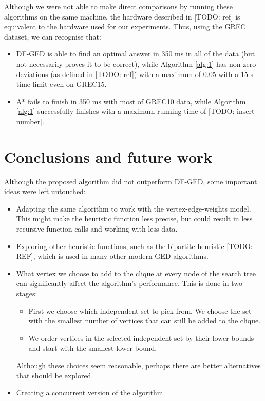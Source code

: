 \documentclass{article}
\theoremstyle{definition}
\begin{document}
Although we were not able to make direct comparisons by running these algorithms on the same machine, the hardware described in [TODO: ref] is equivalent to the hardware used for our experiments. Thus, using the GREC dataset, we can recognise that:
\begin{itemize}
\item DF-GED is able to find an optimal answer in 350 ms in all of the data (but not necessarily proves it to be correct), while Algorithm \ref{alg:1} has non-zero deviations (as defined in [TODO: ref]) with a maximum of 0.05 with a 15 s time limit even on GREC15.
\item A* fails to finish in 350 ms with most of GREC10 data, while Algorithm \ref{alg:1} successfully finishes with a maximum running time of [TODO: insert number].
\end{itemize}
\section{Conclusions and future work}
Although the proposed algorithm did not outperform DF-GED, some important ideas were left untouched:
\begin{itemize}
\item Adapting the same algorithm to work with the vertex-edge-weights model. This might make the heuristic function less precise, but could result in less recursive function calls and working with less data.
\item Exploring other heuristic functions, such as the bipartite heuristic [TODO: REF], which is used in many other modern GED algorithms.
\item What vertex we choose to add to the clique at every node of the search tree can significantly affect the algorithm's performance. This is done in two stages:
  \begin{itemize}
  \item First we choose which independent set to pick from. We choose the set with the smallest number of vertices that can still be added to the clique.
  \item We order vertices in the selected independent set by their lower bounds and start with the smallest lower bound.
  \end{itemize}
  Although these choices seem reasonable, perhaps there are better alternatives that should be explored.
\item Creating a concurrent version of the algorithm.
\end{itemize}
\end{document}
